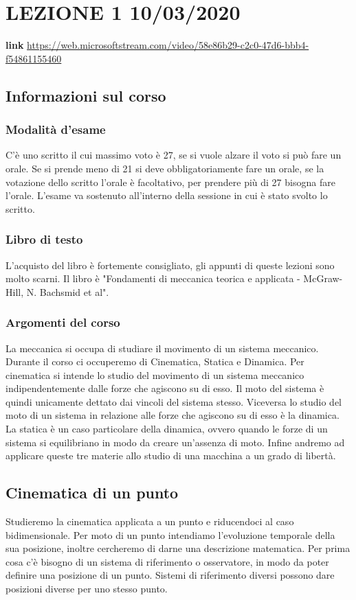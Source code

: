 \section{LEZIONE 1 10/03/2020}
\textbf{link} \url{https://web.microsoftstream.com/video/58e86b29-c2c0-47d6-bbb4-f54861155460}
\subsection{Informazioni sul corso}
\subsubsection{Modalità d'esame}
C'è uno scritto il cui massimo voto è 27, se si vuole alzare il voto si può fare un orale. Se si prende meno di 21 si deve obbligatoriamente fare un orale, se la votazione dello scritto l'orale è facoltativo, per prendere più di 27 bisogna fare l'orale. L'esame va sostenuto all'interno della sessione in cui è stato svolto lo scritto.
\subsubsection{Libro di testo}
L'acquisto del libro è fortemente consigliato, gli appunti di queste lezioni sono molto scarni. Il libro è "Fondamenti di meccanica teorica e applicata - McGraw-Hill, N. Bachsmid et al".
\subsubsection{Argomenti del corso}
La meccanica si occupa di studiare il movimento di un sistema meccanico. Durante il corso ci occuperemo di Cinematica, Statica e Dinamica.\newline
Per cinematica si intende lo studio del movimento di un sistema meccanico indipendentemente dalle forze che agiscono su di esso. Il moto del sistema è quindi unicamente dettato dai vincoli del sistema stesso.\newline
Viceversa lo studio del moto di un sistema in relazione alle forze che agiscono su di esso è la dinamica.\newline
La statica è un caso particolare della dinamica, ovvero quando le forze di un sistema si equilibriano in modo da creare un'assenza di moto.\newline
Infine andremo ad applicare queste tre materie allo studio di una macchina a un grado di libertà.\newline
\subsection{Cinematica di un punto}
Studieremo la cinematica applicata a un punto e riducendoci al caso bidimensionale.\newline
Per moto di un punto intendiamo l'evoluzione temporale della sua posizione, inoltre cercheremo di darne una descrizione matematica.\newline
Per prima cosa c'è bisogno di un sistema di riferimento o osservatore, in modo da poter definire una posizione di un punto. Sistemi di riferimento diversi possono dare posizioni diverse per uno stesso punto.\newline
